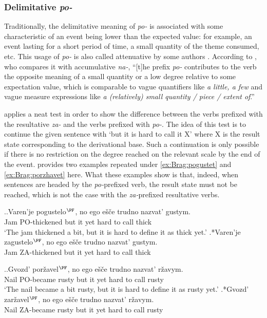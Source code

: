 \subsubsection{Delimitative \textit{po-}}
Traditionally, the delimitative meaning of \textit{po-} is associated with some characteristic of an event being lower than the expected value: for example, an event lasting for a short period of time, a small quantity of the theme consumed, etc. This usage of \textit{po-} is also called attenuative by some authors \citep[e.g.][]{Svenonius:04b}. According to \citet[47--48]{Filip:00}, who compares it with accumulative \textit{na-}, ``[t]he prefix \textit{po-} contributes to the verb the opposite meaning of a small quantity or a low degree relative to some expectation value, which is comparable to vague quantifiers like \textit{a little, a few} and vague measure expressions like \textit{a (relatively) small quantity / piece / extent of}.''

\citet[183]{Braginsky:08} applies a neat test in order to show the difference between the verbs prefixed with the resultative \textit{za-} and the verbs prefixed with \textit{po-}. The idea of this test is to continue the given sentence with `but it is hard to call it X' where X is the result state corresponding to the derivational base. Such a continuation is only possible if there is no restriction on the degree reached on the relevant scale by the end of the event. \citet[183]{Braginsky:08} provides two examples repeated under \ref{ex:Brag:pogustet} and \ref{ex:Brag:porzhavet} here. What these examples show is that, indeed, when sentences are headed by the \textit{po-}prefixed verb, the result state must not be reached, which is not the case with the \textit{za-}prefixed resultative verbs.

\ex.\label{ex:Brag:pogustet}\ag.Varen'je pogustelo$^{\PF}$, no ego e\v{s}\v{c}e trudno nazvat' gustym.\\
Jam PO-thickened but it yet hard {to call} thick\\
\trans `The jam thickened a bit, but it is hard to define it as thick yet.'
\bg.*Varen'je zagustelo$^{\PF}$, no ego e\v{s}\v{c}e trudno nazvat' gustym.\\
Jam ZA-thickened but it yet hard {to call} thick\\

\ex.\label{ex:Brag:porzhavet}\ag.Gvozd' por\v{z}avel$^{\PF}$, no ego e\v{s}\v{c}e trudno nazvat' r\v{z}avym.\\
Nail {PO-became rusty} but it yet hard {to call} rusty\\
\trans `The nail became a bit rusty, but it is hard to define it as rusty yet.'
\bg.*Gvozd' zar\v{z}avel$^{\PF}$, no ego e\v{s}\v{c}e trudno nazvat' r\v{z}avym.\\
Nail {ZA-became rusty} but it yet hard {to call} rusty\\

